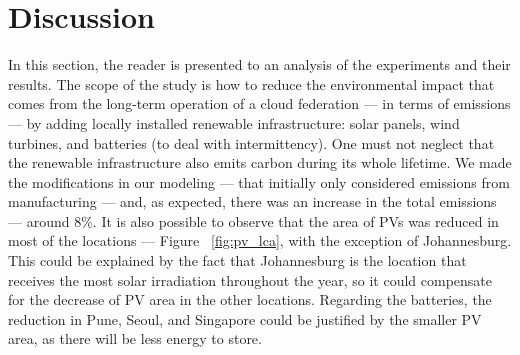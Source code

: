 









\section{Discussion}
\label{sec:long_term_discussion}

In this section, the reader is presented to an analysis of the experiments and their results. The scope of the study is how to reduce the environmental impact that comes from the long-term operation of a cloud federation --- in terms of  emissions --- by adding locally installed renewable infrastructure: solar panels, wind turbines, and batteries (to deal with intermittency). One must not neglect that the renewable infrastructure also emits carbon during its whole lifetime. We made the modifications in our modeling --- that initially only considered emissions from manufacturing --- and, as expected, there was an increase in the total emissions --- around 8\%. It is also possible to observe that the area of PVs was reduced in most of the locations --- Figure ~\ref{fig:pv_lca}, with the exception of Johannesburg. This could be explained by the fact that Johannesburg is the location that receives the most solar irradiation throughout the year, so it could compensate for the decrease of PV area in the other locations. Regarding the batteries, the reduction in Pune, Seoul, and Singapore could be justified by the smaller PV area, as there will be less energy to store.

